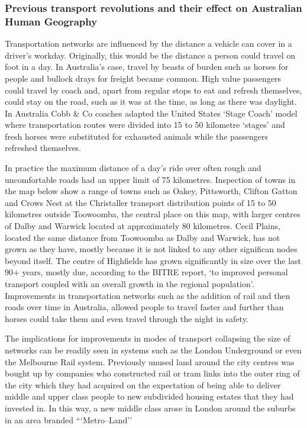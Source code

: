 \subsubsection{Previous transport revolutions and their effect on Australian Human Geography}
Transportation networks are influenced by the distance a vehicle can cover in a driver's workday. Originally, this would be the distance a person could travel on foot in a day. In Australia's case, travel by beasts of burden such as horses for people and bullock drays for freight became common. High value passengers could travel by coach and, apart from regular stops to eat and refresh themselves, could stay on the road, such as it was at the time, as long as there was daylight. In Australia Cobb \& Co coaches adapted the United States `Stage Coach' model where transportation routes were divided into 15 to 50 kilometre `stages' and fresh horses were substituted for exhausted animals while the passengers refreshed themselves\cite{RefWorks:309}.

In practice the maximum distance of a day's ride over often rough and uncomfortable roads had an upper limit of 75 kilometres. Inspection of towns in the map below show a range of towns such as Oakey, Pittsworth, Clifton Gatton and Crows Nest at the Christaller transport distribution points of 15 to 50 kilometres outside Toowoomba, the central place on this map, with larger centres of Dalby and Warwick located at approximately 80 kilometres. Cecil Plains, located the same distance from Toowoomba as Dalby and Warwick, has not grown as they have, mostly because it is not linked to any other significan nodes beyond itself. The centre of Highfields has grown significantly in size over the last 90+ years, mostly due, according to the BITRE report, `to improved personal transport coupled with an overall growth in the regional population'\cite[p107]{RefWorks:308}. Improvements in transportation networks such as the addition of rail and then roads over time in Australia, allowed people to travel faster and further than horses could take them and even travel through the night in safety.



The implications for improvements in modes of transport collapsing the size of networks can be readily seen in systems such as the London Underground or even the Melbourne Rail system. Previously unused land around the city centres was bought up by companies who constructed rail or tram links into the outer ring of the city which they had acquired on the expectation of being able to deliver middle and upper class people to new subdivided housing estates that they had invested in. In this way, a new middle class arose in London around the suburbs in an area branded ```Metro--Land''

